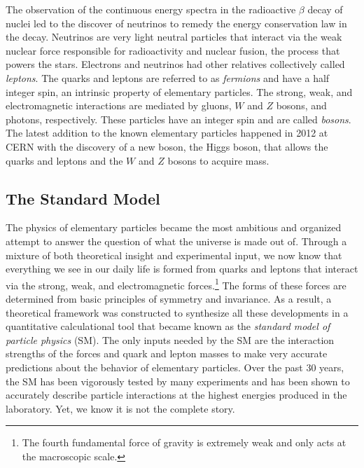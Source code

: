 The observation of the continuous energy spectra in the radioactive $\beta$ decay of nuclei 
led to the discover of neutrinos to remedy  the energy conservation law in the decay. 
Neutrinos are very light neutral particles that interact via the weak nuclear force 
responsible for radioactivity and nuclear fusion, the process that powers the stars.
Electrons and neutrinos had other relatives collectively called \textit{leptons}.
The quarks and leptons are referred to as \textit{fermions} and
have a half integer spin, an intrinsic property of elementary particles.
The strong, weak, and electromagnetic interactions are mediated by 
gluons, $W$ and $Z$ bosons, and photons, respectively. These particles 
have an integer spin and are called \textit{bosons}. 
%
The latest addition to the known elementary particles happened in 2012 
at CERN with the discovery of 
a new boson, the Higgs boson, 
that allows the quarks and leptons and the $W$ and $Z$ bosons to 
acquire mass\cite{Aad:2012tfa,Chatrchyan:2012xdj}.

\subsection*{The Standard Model}
The physics of elementary particles became the most ambitious and organized attempt to answer the question of what the universe is 
made out of. 
Through a mixture of both theoretical insight and experimental input, we now 
know that everything we see in our daily life is formed from quarks and leptons
that interact via the strong, weak, and electromagnetic forces.\footnote{ 
The fourth fundamental force of gravity is extremely weak and
only acts at the macroscopic scale.}
The forms of these forces are determined from basic principles of 
symmetry and invariance.
As a result, a theoretical framework was constructed to synthesize all these 
developments in a quantitative 
calculational tool that became known as the \textit{standard model of particle physics} (SM). 
The only inputs needed by the SM are the interaction strengths of the forces and quark and lepton masses to make 
very accurate predictions about the behavior of elementary particles.
Over the past 30 years, the SM has been vigorously tested by many 
experiments and has been shown to accurately describe particle 
interactions at the highest energies produced in the laboratory.
 Yet, we know it is not the complete story. 


